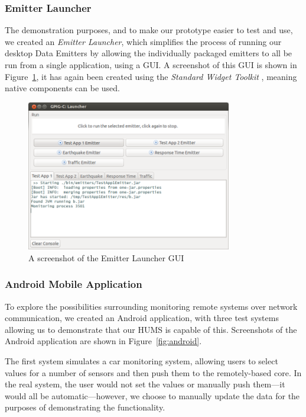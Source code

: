 \documentclass[10pt,a4paper]{article}
\begin{document}
\subsubsection{Emitter Launcher}
The demonstration purposes, and to make our prototype easier to test and use, we created an \emph{Emitter Launcher}, which simplifies the process of running our desktop Data Emitters by allowing the individually packaged emitters to all be run from a single application, using a GUI. A screenshot of this GUI is shown in Figure~\ref{fig:launcherGUI}, it has again been created using the \emph{Standard Widget Toolkit} \cite{swt}, meaning native components can be used.
 
\begin{figure}[tbp]
\centering
\includegraphics*[width=0.8\textwidth]{images/launcherGUI.png}
\caption{A screenshot of the Emitter Launcher GUI}
\label{fig:launcherGUI}
\end{figure}

\subsubsection{Android Mobile Application}
To explore the possibilities surrounding monitoring remote systems over network communication, we created an Android application, with three test systems allowing us to demonstrate that our HUMS is capable of this. Screenshots of the Android application are shown in Figure~\ref{fig:android}.

The first system simulates a car monitoring system, allowing users to select values for a number of sensors and then push them to the remotely-based core. In the real system, the user would not set the values or manually push them---it would all be automatic---however, we choose to manually update the data for the purposes of demonstrating the functionality.
\end{document}
